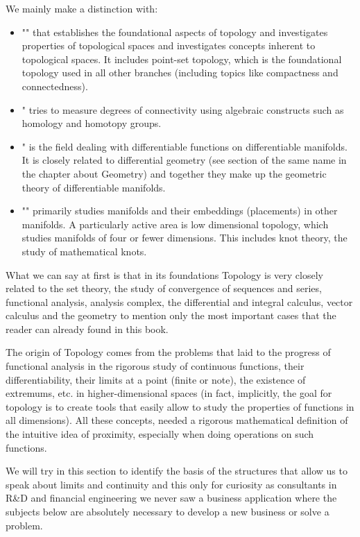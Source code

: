 We mainly make a distinction with:
	\begin{itemize}
		\item "" that establishes the foundational aspects of topology and investigates properties of topological spaces and investigates concepts inherent to topological spaces. It includes point-set topology, which is the foundational topology used in all other branches (including topics like compactness and connectedness).
		
		\item " tries to measure degrees of connectivity using algebraic constructs such as homology and homotopy groups.
		\item " is the field dealing with differentiable functions on differentiable manifolds. It is closely related to differential geometry (see section of the same name in the chapter about Geometry) and together they make up the geometric theory of differentiable manifolds.
		\item "" primarily studies manifolds and their embeddings (placements) in other manifolds. A particularly active area is low dimensional topology, which studies manifolds of four or fewer dimensions. This includes knot theory, the study of mathematical knots.	
	\end{itemize}
	What we can say at first is that in its foundations Topology is very closely related to the set theory, the study of convergence of sequences and series, functional analysis, analysis complex, the differential and integral calculus, vector calculus and the geometry to mention only the most important cases that the reader can already found in this book.

	The origin of Topology comes from the problems that laid to the progress of functional analysis in the rigorous study of continuous functions, their differentiability, their limits at a point (finite or note), the existence of extremums, etc. in higher-dimensional spaces (in fact, implicitly, the goal for topology is to create tools that easily allow to study the properties of functions in all dimensions). All these concepts, needed a rigorous mathematical definition of the intuitive idea of proximity, especially when doing operations on such functions.

	We will try in this section to identify the basis of the structures that allow us to speak about limits and continuity and this only for curiosity as consultants in R\&D and financial engineering we never saw a business application where the subjects below are absolutely necessary to develop a new business or solve a problem. 
	
